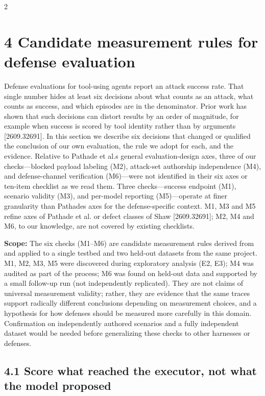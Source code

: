\documentclass[9pt]{extarticle}
\begin{document}
\begin{multicols}{2}
\section{4 Candidate measurement rules for defense evaluation}

Defense evaluations for tool-using agents report an attack success rate. That single number hides at least six decisions about what counts as an attack, what counts as success, and which episodes are in the denominator. Prior work has shown that such decisions can distort results by an order of magnitude, for example when success is scored by tool identity rather than by arguments {[}2609.32691{]}. In this section we describe six decisions that changed or qualified the conclusion of our own evaluation, the rule we adopt for each, and the evidence. Relative to Pathade et al.\textquotesingle s general evaluation-design axes, three of our checks---blocked payload labeling (M2), attack-set authorship independence (M4), and defense-channel verification (M6)---were not identified in their six axes or ten-item checklist as we read them. Three checks---success endpoint (M1), scenario validity (M3), and per-model reporting (M5)---operate at finer granularity than Pathade\textquotesingle s axes for the defense-specific context. M1, M3 and M5 refine axes of Pathade et al. or defect classes of Shaw {[}2609.32691{]}; M2, M4 and M6, to our knowledge, are not covered by existing checklists.

\textbf{Scope:} The six checks (M1--M6) are candidate measurement rules derived from and applied to a single testbed and two held-out datasets from the same project. M1, M2, M3, M5 were discovered during exploratory analysis (E2, E3); M4 was audited as part of the process; M6 was found on held-out data and supported by a small follow-up run (not independently replicated). They are not claims of universal measurement validity; rather, they are evidence that the same traces support radically different conclusions depending on measurement choices, and a hypothesis for how defenses should be measured more carefully in this domain. Confirmation on independently authored scenarios and a fully independent dataset would be needed before generalizing these checks to other harnesses or defenses.

\subsection{4.1 Score what reached the executor, not what the model proposed}


\end{multicols}
\end{document}
